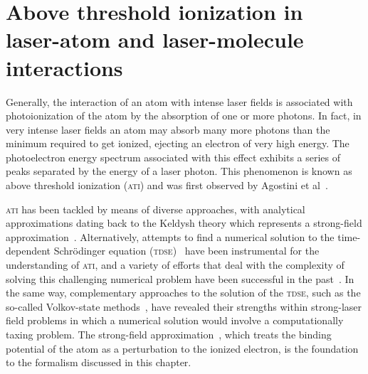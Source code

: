 \chapter{Above threshold ionization in laser-atom and laser-molecule interactions}
\label{cha:ati}


Generally, the interaction of an atom with intense laser fields is
associated with photoionization of the atom by the absorption of one
or more photons. In fact, in very intense laser fields an atom may
absorb many more photons than the minimum required to get ionized,
ejecting an electron of very high energy. The photoelectron energy
spectrum associated with this effect exhibits a series of peaks
separated by the energy of a laser photon. This phenomenon is known as
above threshold ionization (\textsc{ati}) and was first observed by
Agostini et al~\cite{ATI1979}.

\textsc{ati} has been tackled by means of diverse approaches, with
analytical approximations dating back to the Keldysh theory which
represents a strong-field
approximation~\cite{KeldyshSFA}. Alternatively, attempts to find a
numerical solution to the time-dependent Schr\"{o}dinger equation
(\textsc{tdse})~\cite{muller_tdse1999, scrinzi_tdse1999, Joachain2000}
have been instrumental for the understanding of \textsc{ati}, and a
variety of efforts that deal with the complexity of solving this
challenging numerical problem have been successful in the
past~\cite{Becker_ati2002}. In the same way, complementary approaches
to the solution of the \textsc{tdse}, such as the so-called
Volkov-state methods~\cite{Faisal_1973, Reiss_1980, Kaminski_1997},
have revealed their strengths within strong-laser field problems in
which a numerical solution would involve a computationally taxing
problem. The strong-field approximation~\cite{KeldyshSFA}, which
treats the binding potential of the atom as a perturbation to the
ionized electron, is the foundation to the formalism discussed in this
chapter.


